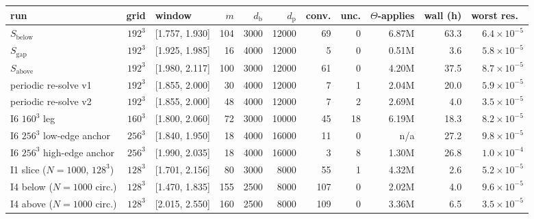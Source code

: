 \begin{tabular}{@{}lrlrrrrrrrr@{}}
\hline\hline
 run & grid & window & $m$ & $d_\mathrm{b}$ & $d_\mathrm{p}$ & conv. & unc. & $\Theta$-applies & wall (h) & worst res.\ \\
\hline
 $S_\mathrm{below}$ & $192^3$ & [1.757, 1.930] & 104 & 3000 & 12000 & 69 & 0 & 6.87M & 63.3 & $6.4\times10^{-5}$ \\
 $S_\mathrm{gap}$ & $192^3$ & [1.925, 1.985] & 16 & 4000 & 12000 & 5 & 0 & 0.51M & 3.6 & $5.8\times10^{-5}$ \\
 $S_\mathrm{above}$ & $192^3$ & [1.980, 2.117] & 100 & 3000 & 12000 & 61 & 0 & 4.20M & 37.5 & $8.7\times10^{-5}$ \\
 periodic re-solve v1 & $192^3$ & [1.855, 2.000] & 30 & 4000 & 12000 & 7 & 1 & 2.04M & 20.0 & $5.9\times10^{-5}$ \\
 periodic re-solve v2 & $192^3$ & [1.855, 2.000] & 48 & 4000 & 12000 & 7 & 2 & 2.69M & 4.0 & $3.5\times10^{-5}$ \\
 I6 $160^3$ leg & $160^3$ & [1.800, 2.060] & 72 & 3000 & 10000 & 45 & 18 & 6.19M & 18.3 & $8.2\times10^{-5}$ \\
 I6 $256^3$ low-edge anchor & $256^3$ & [1.840, 1.950] & 18 & 4000 & 16000 & 11 & 0 & n/a & 27.2 & $9.8\times10^{-5}$ \\
 I6 $256^3$ high-edge anchor & $256^3$ & [1.990, 2.035] & 18 & 4000 & 16000 & 3 & 8 & 1.30M & 26.8 & $1.0\times10^{-4}$ \\
 I1 slice ($N=1000$, $128^3$) & $128^3$ & [1.701, 2.156] & 80 & 3000 & 8000 & 55 & 1 & 4.32M & 2.6 & $5.2\times10^{-5}$ \\
 I4 below ($N=1000$ circ.) & $128^3$ & [1.470, 1.835] & 155 & 2500 & 8000 & 107 & 0 & 2.02M & 4.0 & $9.6\times10^{-5}$ \\
 I4 above ($N=1000$ circ.) & $128^3$ & [2.015, 2.550] & 160 & 2500 & 8000 & 109 & 0 & 3.36M & 6.5 & $3.5\times10^{-5}$ \\
\hline\hline
\end{tabular}
